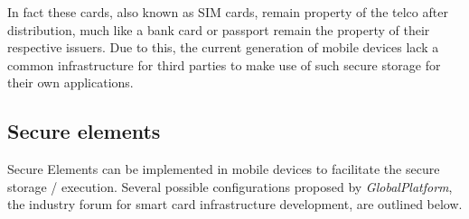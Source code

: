 In fact these cards, also known as SIM cards, remain property of the telco after distribution, much like a bank card or passport remain the property of their respective issuers. %
Due to this, the current generation of mobile devices lack a common infrastructure for third parties to make use of such secure storage for their own applications.






\subsection{Secure elements}
Secure Elements can be implemented in mobile devices to facilitate the secure storage / execution.
Several possible configurations proposed by \textit{GlobalPlatform}, the industry forum for smart card infrastructure development, are outlined below. \cite{Reveilhac:2009:PSE:1548884.1549404,GlobalPlatformSEs}




